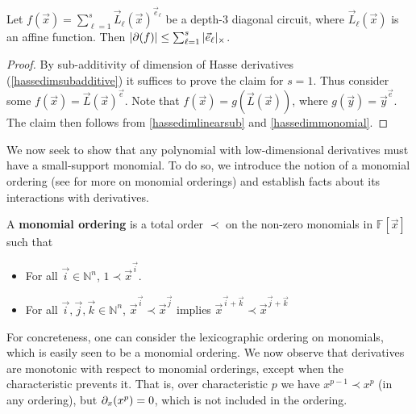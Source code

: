\documentclass[letterpaper,11pt]{article}
\numberwithin{equation}{section}
\theoremstyle{plain}
\theoremstyle{remark}
\newcommand{\F}{\mathbb{F}}
\newcommand{\N}{\mathbb{N}}
\begin{document}
\begin{lemma}
	\label{hassedimdiagonal}
	Let $f(\vec{x})=\sum_{\ell=1}^s\vec{L}_\ell(\vec{x})^{\vec{e}_\ell}$ be a depth-3 diagonal circuit, where $\vec{L}_\ell(\vec{x})$ is an affine function. Then $|\partial(f)|\le \sum_{\ell=1}^s |\vec{e}_\ell|_\times$.
\end{lemma}
\begin{proof}
	By sub-additivity of dimension of Hasse derivatives (\autoref{hassedimsubadditive}) it suffices to prove the claim for $s=1$.  Thus consider some $f(\vec{x})=\vec{L}(\vec{x})^{\vec{e}}$.  Note that $f(\vec{x})=g(\vec{L}(\vec{x}))$, where $g(\vec{y})=\vec{y}^{\vec{e}}$.  The claim then follows from \autoref{hassedimlinearsub} and \autoref{hassedimmonomial}.
\end{proof}

We now seek to show that any polynomial with low-dimensional derivatives must have a small-support monomial.  To do so, we introduce the notion of a monomial ordering (see \cite{CLO} for more on monomial orderings) and establish facts about its interactions with derivatives.

\begin{definition}
	A \textbf{monomial ordering} is a total order $\prec$ on the non-zero monomials in $\F[\vec{x}]$ such that
	\begin{itemize}
		\item For all $\vec{i}\in\N^n$, $1\prec \vec{x}^{\vec{i}}$.
		\item For all $\vec{i},\vec{j},\vec{k}\in\N^n$, $\vec{x}^{\vec{i}}\prec\vec{x}^{\vec{j}}$ implies $\vec{x}^{\vec{i}+\vec{k}}\prec\vec{x}^{\vec{j}+\vec{k}}$
	\end{itemize}
\end{definition}

For concreteness, one can consider the lexicographic ordering on monomials, which is easily seen to be a monomial ordering.  We now observe that derivatives are monotonic with respect to monomial orderings, except when the characteristic prevents it.  That is, over characteristic $p$ we have $x^{p-1}\prec x^p$ (in any ordering), but $\partial_x(x^p)=0$, which is not included in the ordering.
\end{document}
